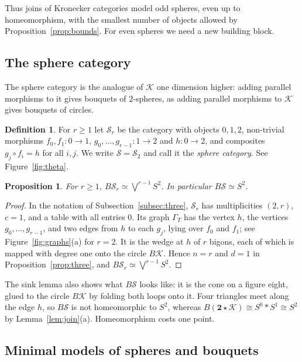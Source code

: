 \documentclass[12pt]{amsart}
\newtheorem{proposition}[teo]{Proposition}
\theoremstyle{definition}
\newtheorem{definition}[teo]{Definition}
\theoremstyle{remark}
\newcommand{\co}{\colon}
\newcommand{\K}{\mathcal{K}}
\newcommand{\Sph}{\mathcal{S}}
\begin{document}
Thus joins of Kronecker categories model odd spheres, even up to homeomorphism, with the smallest number of objects allowed by Proposition~\ref{prop:bounds}. For even spheres we need a new building block.

\subsection{The sphere category}\label{subsec:theta}

The sphere category is the analogue of $\K$ one dimension higher: adding parallel morphisms to it gives bouquets of $2$-spheres, as adding parallel morphisms to $\K$ gives bouquets of circles.

\begin{definition}\label{def:theta}
For $r\ge1$ let $\Sph_r$ be the category with objects $0,1,2$, non-trivial morphisms $f_0,f_1\co0\to1$, $g_0,\dots,g_{r-1}\co1\to2$ and $h\co0\to2$, and composites $g_j\circ f_i=h$ for all $i,j$. We write $\Sph=\Sph_2$ and call it the \emph{sphere category}. See Figure~\ref{fig:theta}.
\end{definition}

\begin{proposition}\label{prop:theta}
For $r\ge1$, $B\Sph_r\simeq\bigvee^{r-1}S^2$. In particular $B\Sph\simeq S^2$.
\end{proposition}

\begin{proof}
In the notation of Subsection~\ref{subsec:three}, $\Sph_r$ has multiplicities $(2,r)$, $c=1$, and a table with all entries $0$. Its graph $\Gamma_T$ has the vertex $h$, the vertices $g_0,\dots,g_{r-1}$, and two edges from $h$ to each $g_j$, lying over $f_0$ and $f_1$; see Figure~\ref{fig:graphs}(a) for $r=2$. It is the wedge at $h$ of $r$ bigons, each of which is mapped with degree one onto the circle $B\K$. Hence $n=r$ and $d=1$ in Proposition~\ref{prop:three}, and $B\Sph_r\simeq\bigvee^{r-1}S^2$.
\end{proof}

The sink lemma also shows what $B\Sph$ looks like: it is the cone on a figure eight, glued to the circle $B\K$ by folding both loops onto it. Four triangles meet along the edge $h$, so $B\Sph$ is not homeomorphic to $S^2$, whereas $B(\mathbf 2\star\K)\cong S^0*S^1\cong S^2$ by Lemma~\ref{lem:join}(a). Homeomorphism costs one point.

\subsection{Minimal models of spheres and bouquets}\label{subsec:bouquets}
\end{document}
